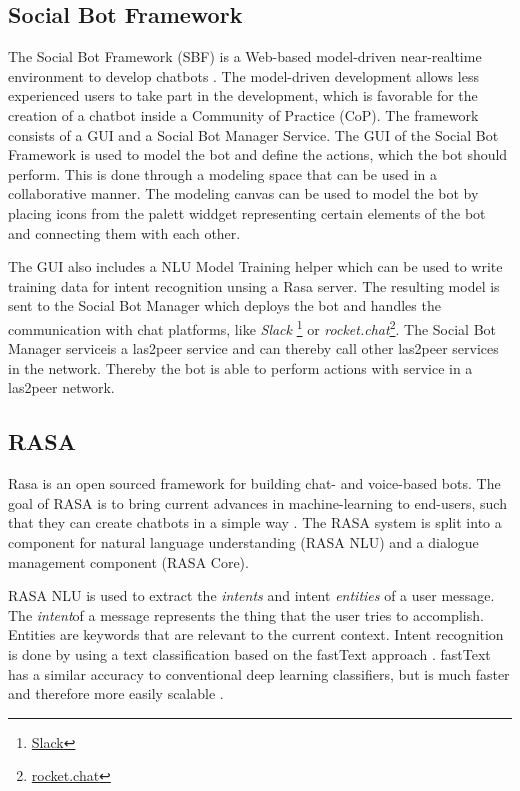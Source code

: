 \subsection{Social Bot Framework}
The Social Bot Framework (SBF) is a Web-based model-driven near-realtime environment to develop chatbots \cite{NLKl19}. 
The model-driven development allows less experienced users to take part in the development, which is favorable for the creation of a chatbot inside a Community of Practice (CoP). 
The framework consists of a GUI and a Social Bot Manager Service.
The GUI of the Social Bot Framework is used to model the bot and define the actions, which the bot should perform. 
This is done through a modeling space that can be used in a collaborative manner. The modeling canvas can be used to model the bot by placing icons from the palett widdget representing certain elements of the bot and connecting them with each other. 

The GUI also includes a NLU Model Training helper which can be used to write training data for intent recognition unsing a Rasa server.
The resulting model is sent to the Social Bot Manager which deploys the bot and handles the communication with chat platforms, like \emph{Slack} \footnote{\href{https://slack.com/}{Slack}} or \emph{rocket.chat}\footnote{\href{https://rocket.chat/}{rocket.chat}}. 
The Social Bot Manager service\footnotemark is a las2peer service and can thereby call other las2peer services in the network. 
Thereby the bot is able to perform actions with service in a las2peer network.

\subsection{RASA}
Rasa is an open sourced framework for building chat- and voice-based bots. The goal of RASA is to bring current advances in machine-learning to end-users, such that they can create chatbots in a simple way \cite{BFPN17}. 
The RASA system is split into a component for natural language understanding (RASA NLU) and a dialogue management component (RASA Core).

RASA NLU is used to extract the \emph{intents} and intent \emph{entities} of a user message.
The \emph{intent}\footnotemark of a message represents the thing that the user tries to accomplish. 
Entities are keywords that are relevant to the current context.
Intent recognition is done by using a text classification based on the fastText approach \cite{BFPN17}. 
fastText has a similar accuracy to conventional deep learning classifiers, but is much faster and therefore more easily scalable \cite{JGBM16}.

